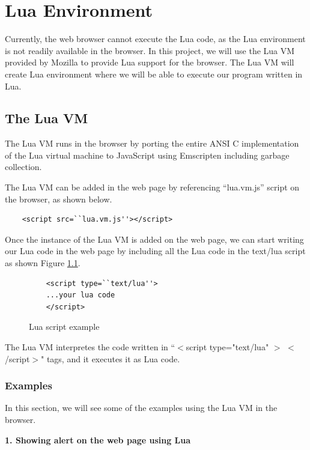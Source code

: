 \chapter{Lua Environment} \label{lua}

Currently, the web browser cannot execute the Lua code, as the Lua environment is not readily available in the browser. In this project, we will use the Lua VM provided by Mozilla \cite{luavm} to provide Lua support for the browser. The Lua VM will create Lua environment where we will be able to execute our program written in Lua.

\section{The Lua VM}

The Lua VM runs in the browser by porting the entire ANSI C implementation of the Lua virtual machine to JavaScript using Emscripten \cite{emscripten} including garbage collection.

The Lua VM can be added in the web page by referencing ``lua.vm.js'' script on the browser, as shown below.

\begin{lstlisting}
    <script src=``lua.vm.js''></script>
\end{lstlisting}

Once the instance of the Lua VM is added on the web page, we can start writing our Lua code in the web page by including all the Lua code in the text/lua script as shown Figure \ref{fig:luascript}.

\begin{figure}[h]
	\begin{lstlisting}
	<script type=``text/lua''>
	...your lua code
	</script>
	\end{lstlisting}
	\caption{Lua script example}
	\label{fig:luascript}
\end{figure}

The Lua VM interpretes the code written in ``$<$script type="text/lua" $>$ $<$/script$>$" tags, and it executes it as Lua code.

\subsection{Examples}

In this section, we will see some of the examples using the Lua VM in the browser.

\textbf{1. Showing alert on the web page using Lua}

